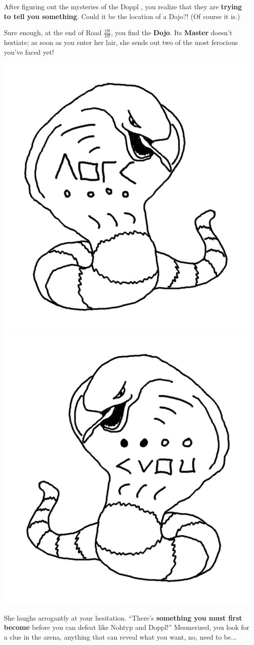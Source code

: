 

After figuring out the mysteries of the Doppl \mappMobidash{}, you realize
that they are \textbf{trying to tell you something}. Could it be the location of
a \mappMobidot{} Dojo?! (Of course it is.)

Sure enough, at the end of Road \(\frac{19!}{18!}\), you find the \textbf{Dojo}.
Its \textbf{Master} doesn't hestiate; as soon as you enter her lair,
she sends out two of the most ferocious \mappMobidot{} you've faced yet!

\begin{center}
\includegraphics[width=0.4\linewidth]{assets/not-arbok-1.png}
\includegraphics[width=0.4\linewidth]{assets/not-arbok-2.png}
\end{center}

She laughs arrogantly at your hesitation.  ``There's \textbf{something you must
first become} before you can defeat \mappMobidot{} like Nohtyp and Doppl!''
Mesmerized, you look for a clue in the arena, anything that can reveal
what you want, no, need to be...


